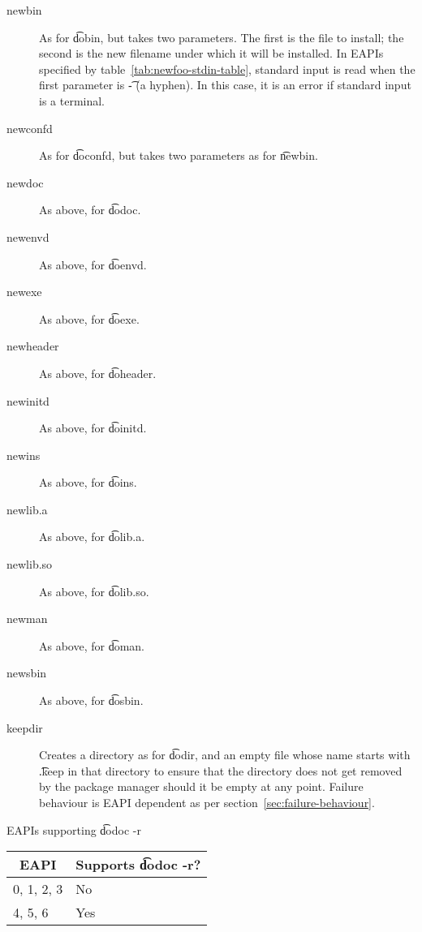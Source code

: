 \begin{description}
\item[newbin]  As for \t{dobin}, but takes two parameters. The first is
    the file to install; the second is the new filename under which it will be installed. In EAPIs
    specified by table~\ref{tab:newfoo-stdin-table}, standard input is read when the first
    parameter is \t{-} (a hyphen). In this case, it is an error if standard input is a terminal.

\item[newconfd] As for \t{doconfd}, but takes two parameters as for \t{newbin}.

\item[newdoc] As above, for \t{dodoc}.

\item[newenvd] As above, for \t{doenvd}.

\item[newexe] As above, for \t{doexe}.

\item[newheader] As above, for \t{doheader}.

\item[newinitd] As above, for \t{doinitd}.

\item[newins] As above, for \t{doins}.

\item[newlib.a] As above, for \t{dolib.a}.

\item[newlib.so] As above, for \t{dolib.so}.

\item[newman] As above, for \t{doman}.

\item[newsbin] As above, for \t{dosbin}.

\item[keepdir] Creates a directory as for \t{dodir}, and an empty file whose name starts with
    \t{.keep} in that directory to ensure that the directory does not get removed by the
    package manager should it be empty at any point. Failure behaviour is EAPI dependent as per
    section~\ref{sec:failure-behaviour}.

\end{description}

\begin{centertable}{EAPIs supporting \t{dodoc -r}}
    \label{tab:dodoc-table}
    \begin{tabular}{ll}
      \toprule
      \multicolumn{1}{c}{\textbf{EAPI}} &
      \multicolumn{1}{c}{\textbf{Supports \t{dodoc -r}?}} \\
      \midrule
      0, 1, 2, 3        & No  \\
      4, 5, 6           & Yes \\
      \bottomrule
    \end{tabular}
\end{centertable}


